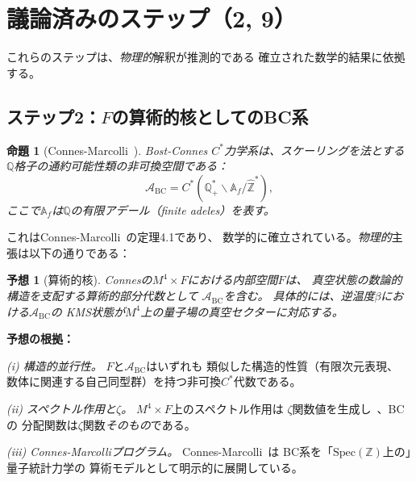 \documentclass[11pt,a4paper]{article}
\newtheorem{proposition}[theorem]{命題}
\newtheorem{conjecture}[theorem]{予想}
\newcommand{\Spec}{\mathrm{Spec}}
\newcommand{\Zhat}{\hat{\mathbb{Z}}}
\begin{document}
\section{議論済みのステップ（2, 9）}
\label{sec:argued}

これらのステップは、\emph{物理的}解釈が推測的である
確立された数学的結果に依拠する。

\subsection{ステップ2：$F$の算術的核としてのBC系}

\begin{proposition}[Connes-Marcolli~\cite{ConnesMarcolli2006}]
Bost-Connes $C^*$力学系は、スケーリングを法とする
$\mathbb{Q}$格子の通約可能性類の非可換空間である：
\begin{equation}
  \mathcal{A}_{\mathrm{BC}} = C^*(\mathbb{Q}_+^* \backslash \mathbb{A}_f / \Zhat^*),
  \label{eq:bc_algebra}
\end{equation}
ここで$\mathbb{A}_f$は$\mathbb{Q}$の有限アデール（finite adeles）を表す。
\end{proposition}

これはConnes-Marcolli~\cite{ConnesMarcolli2006}の定理4.1であり、
数学的に確立されている。\emph{物理的}主張は以下の通りである：

\begin{conjecture}[算術的核]
\label{conj:kernel}
Connesの$M^4 \times F$における内部空間$F$は、
真空状態の数論的構造を支配する算術的部分代数として
$\mathcal{A}_{\mathrm{BC}}$を含む。
具体的には、逆温度$\beta$における$\mathcal{A}_{\mathrm{BC}}$の
KMS状態が$M^4$上の量子場の真空セクターに対応する。
\end{conjecture}

\textbf{予想の根拠：}

\textit{(i) 構造的並行性。}
$F$と$\mathcal{A}_{\mathrm{BC}}$はいずれも
類似した構造的性質（有限次元表現、
数体に関連する自己同型群）を持つ非可換$C^*$代数である。

\textit{(ii) スペクトル作用と$\zeta$。}
$M^4 \times F$上のスペクトル作用は
$\zeta$関数値を生成し~\cite{CCM2007}、BCの
分配関数は$\zeta$関数\emph{そのもの}である。

\textit{(iii) Connes-Marcolliプログラム。}
Connes-Marcolli~\cite{ConnesMarcolli2006}は
BC系を「$\Spec(\mathbb{Z})$上の」量子統計力学の
算術モデルとして明示的に展開している。
\end{document}
